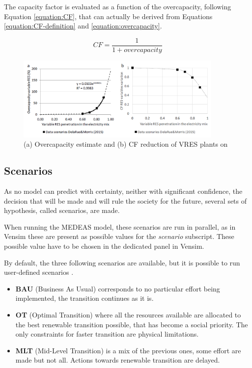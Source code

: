 The capacity factor is evaluated as a function of the overcapacity, following Equation \ref{equation:CF}, that can actually be derived from Equations \ref{equation:CF-definition} and \ref{equation:overcapacity}.

\begin{equation}
    CF=\frac{1}{1+overcapacity}
    \label{equation:CF}
\end{equation}

\begin{figure}[h]
    \includegraphics[width=0.9\textwidth]{resources/images/vres-impact-estimate.png}
    \caption{(a) Overcapacity estimate and (b) CF reduction of VRES plants on \cite{medeas-eroi}}
    \label{fig:vres-overcapacities}
\end{figure}

\subsection{Scenarios} \label{section:medeas-scenarios}

As no model can predict with certainty, neither with significant confidence, the decision that will be made and will rule the society for the future, several sets of hypothesis, called scenarios, are made.

When running the MEDEAS model, these scenarios are run in parallel, as in Vensim these are present as possible values for the \textit{scenario} subscript. These possible value have to be chosen in the dedicated panel in Vensim.

By default, the three following scenarios are available, but it is possible to run user-defined scenarios \cite{medeas-website}.

\begin{itemize}
    \item \textbf{BAU} (Business As Usual) corresponds to no particular effort being implemented, the transition continues as it is.
    \item \textbf{OT} (Optimal Transition) where all the resources available are allocated to the best renewable transition possible, that has become a social priority. The only constraints for faster transition are physical limitations.
    \item \textbf{MLT} (Mid-Level Transition) is a mix of the previous ones, some effort are made but not all. Actions towards renewable transition are delayed.
\end{itemize}

